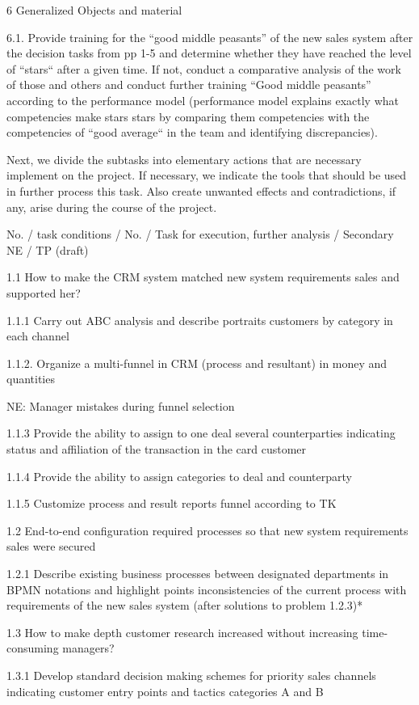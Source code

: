 \documentclass[11pt,a4paper]{book}
\begin{document}
6 Generalized Objects and material

6.1.  Provide training for the “good middle peasants” of the new sales system
after the decision tasks from pp 1-5 and determine whether they have reached
the level of “stars“ after a given time.  If not, conduct a comparative
analysis of the work of those and others and conduct further training “Good
middle peasants” according to the performance model (performance model
explains exactly what competencies make stars stars by comparing them
competencies with the competencies of “good average“ in the team and
identifying discrepancies).

Next, we divide the subtasks into elementary actions that are necessary
implement on the project. If necessary, we indicate the tools that should be
used in further process this task. Also create unwanted effects and
contradictions, if any, arise during the course of the project.

No. / task conditions / No. / Task for execution, further analysis / Secondary
NE / TP (draft)

1.1 How to make the CRM system matched new system requirements sales and
supported her?

1.1.1 Carry out ABC analysis and describe portraits customers by category in
each channel

1.1.2. Organize a multi-funnel in CRM (process and resultant) in money and
quantities

NE: Manager mistakes during funnel selection

1.1.3 Provide the ability to assign to one deal several counterparties
indicating status and affiliation of the transaction in the card customer

1.1.4 Provide the ability to assign categories to deal and counterparty

1.1.5 Customize process and result reports funnel according to TK

1.2 End-to-end configuration required processes so that new system
requirements sales were secured

1.2.1 Describe existing business processes between designated departments in
BPMN notations and highlight points inconsistencies of the current process
with requirements of the new sales system (after solutions to problem 1.2.3)*

1.3 How to make depth customer research increased without increasing
time-consuming managers?

1.3.1 Develop standard decision making schemes for priority sales channels
indicating customer entry points and tactics categories A and B
\end{document}
